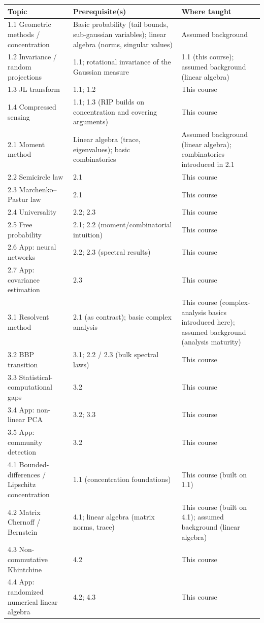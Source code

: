 \documentclass[11pt]{article}
\begin{document}
\begin{longtable}{p{4.3cm}p{5.3cm}p{4.7cm}}
\toprule
\textbf{Topic} & \textbf{Prerequisite(s)} & \textbf{Where taught} \\
\midrule
\endhead
1.1 Geometric methods / concentration & Basic probability (tail bounds, sub-gaussian variables); linear algebra (norms, singular values) & Assumed background \\
1.2 Invariance / random projections & 1.1; rotational invariance of the Gaussian measure & 1.1 (this course); assumed background (linear algebra) \\
1.3 JL transform & 1.1; 1.2 & This course \\
1.4 Compressed sensing & 1.1; 1.3 (RIP builds on concentration and covering arguments) & This course \\
2.1 Moment method & Linear algebra (trace, eigenvalues); basic combinatorics & Assumed background (linear algebra); combinatorics introduced in 2.1 \\
2.2 Semicircle law & 2.1 & This course \\
2.3 Marchenko--Pastur law & 2.1 & This course \\
2.4 Universality & 2.2; 2.3 & This course \\
2.5 Free probability & 2.1; 2.2 (moment/combinatorial intuition) & This course \\
2.6 App: neural networks & 2.2; 2.3 (spectral results) & This course \\
2.7 App: covariance estimation & 2.3 & This course \\
3.1 Resolvent method & 2.1 (as contrast); basic complex analysis & This course (complex-analysis basics introduced here); assumed background (analysis maturity) \\
3.2 BBP transition & 3.1; 2.2 / 2.3 (bulk spectral laws) & This course \\
3.3 Statistical-computational gaps & 3.2 & This course \\
3.4 App: non-linear PCA & 3.2; 3.3 & This course \\
3.5 App: community detection & 3.2 & This course \\
4.1 Bounded-differences / Lipschitz concentration & 1.1 (concentration foundations) & This course (built on 1.1) \\
4.2 Matrix Chernoff / Bernstein & 4.1; linear algebra (matrix norms, trace) & This course (built on 4.1); assumed background (linear algebra) \\
4.3 Non-commutative Khintchine & 4.2 & This course \\
4.4 App: randomized numerical linear algebra & 4.2; 4.3 & This course \\
\bottomrule
\end{longtable}
\end{document}
